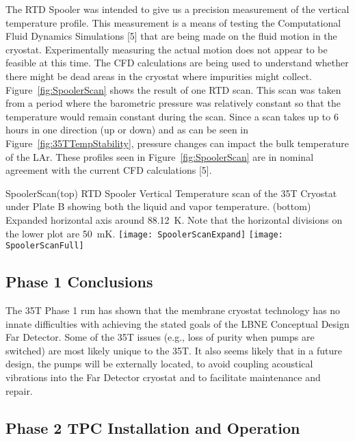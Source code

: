 The RTD Spooler was intended to give us a precision measurement of the vertical temperature profile. 
This measurement is a means of testing the Computational Fluid Dynamics Simulations [5]\fixme{} that 
are being made on the fluid motion in the cryostat. Experimentally measuring the actual motion does not 
appear to be feasible at this time. The CFD calculations are being used to understand whether there 
might be dead areas in the cryostat where impurities might collect. Figure~\ref{fig:SpoolerScan} shows the result of one RTD 
scan. This scan was taken from a period where the barometric pressure was relatively constant so that 
the temperature would remain constant during the scan. Since a scan takes up to 6 hours in one direction 
(up or down) and as can be seen in Figure~\ref{fig:35TTempStability}, pressure changes can impact the 
bulk temperature of the LAr. These profiles seen in Figure~\ref{fig:SpoolerScan} are in nominal 
agreement with the current CFD calculations [5\fixme{}].


\begin{cdrfigure}{SpoolerScan}{(top) RTD Spooler Vertical Temperature scan of the 35T Cryostat under Plate B showing both the liquid and vapor temperature.  (bottom) Expanded horizontal axis around 88.12~K. Note that the horizontal divisions on the lower plot are 50~mK. }
\texttt{[image: SpoolerScanExpand]}  
\texttt{[image: SpoolerScanFull]}
\end{cdrfigure}

\subsection{Phase 1 Conclusions}

The 35T Phase 1 run has shown that the membrane cryostat technology has no innate difficulties with 
achieving the stated goals of the LBNE Conceptual Design Far Detector. Some of the 35T issues (e.g., loss 
of purity when pumps are switched) are most likely unique to the 35T. It also seems likely that in a future 
design, the pumps will be externally located, to avoid coupling acoustical vibrations into the Far Detector 
cryostat and to facilitate maintenance and repair.


\subsection{Phase 2 TPC Installation and Operation}

